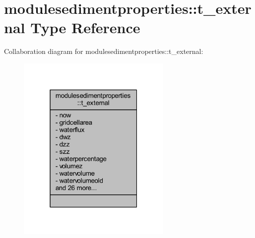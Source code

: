 \hypertarget{structmodulesedimentproperties_1_1t__external}{}\section{modulesedimentproperties\+:\+:t\+\_\+external Type Reference}
\label{structmodulesedimentproperties_1_1t__external}


Collaboration diagram for modulesedimentproperties\+:\+:t\+\_\+external\+:\nopagebreak
\begin{figure}[H]
\begin{center}
\leavevmode
\includegraphics[width=211pt]{structmodulesedimentproperties_1_1t__external__coll__graph}
\end{center}
\end{figure}
